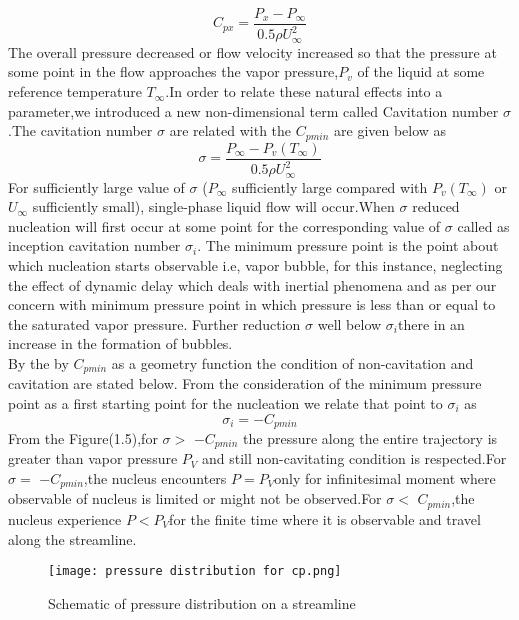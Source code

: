     \begin{equation}
    C_{px} =\frac {P_x-P_{\infty}}{{0.5 \rho {U^{2}_{\infty}}}}
    \end{equation}
   The overall pressure decreased or flow velocity increased so that the pressure at some point in the flow approaches the vapor pressure,$P_v$ of the liquid at some reference temperature $T_{\infty}$.In 
   order to relate these natural effects into a parameter,we introduced a new non-dimensional term called Cavitation number $\sigma$.The cavitation number $\sigma$ are related with the $C_{pmin}$ are 
   given below as 
   \begin{equation}
   \sigma =\frac{{P_{\infty}}-{{P_v}(T_{\infty})}}{{0.5 \rho {U^{2}_{\infty}}}}
   \end{equation}
  For sufficiently large value of $\sigma$ ($P_\infty$ sufficiently large compared with $P_v$$(T_\infty)$ or $U_\infty$ sufficiently small), single-phase liquid flow will occur.When $\sigma$ reduced 
  nucleation will first occur at some point for the corresponding value of $\sigma$ called as inception cavitation number ${\sigma}_i$. The minimum pressure point is the point about which nucleation starts 
  observable i.e, vapor bubble, for this instance, neglecting the effect of dynamic delay which deals with inertial phenomena and  as per our concern with minimum pressure point in which pressure is less than or equal to the saturated
  vapor pressure. Further reduction $\sigma$ well below ${\sigma}_i$there in an increase in the formation of bubbles. \\
  By the by $C_{pmin}$ as a geometry function the condition of non-cavitation and cavitation are stated below. From the consideration of the minimum pressure point as a first starting point for the nucleation we 
  relate that point to ${\sigma}_i$ as 
  \begin{equation}
  {{\sigma}_i} =-C_{pmin}
  \end{equation}
  From the Figure(1.5),for $\sigma >$ $-C_{pmin}$ the pressure along the entire trajectory is greater than vapor pressure $P_V$ and still non-cavitating condition is respected.For $\sigma =$ $-C_{pmin}$,the nucleus encounters $P=P_V$only for infinitesimal moment where observable of nucleus is limited
  or might not be observed.For $\sigma <$ $C_{pmin}$,the nucleus experience $P<P_V$for the finite time where it is observable and travel along the streamline.\\
  \begin{figure}[H]
    \centering
    \texttt{[image: pressure distribution for cp.png]}
    \caption{Schematic of pressure distribution on a streamline}
    \label{fig:fig5}
\end{figure}

